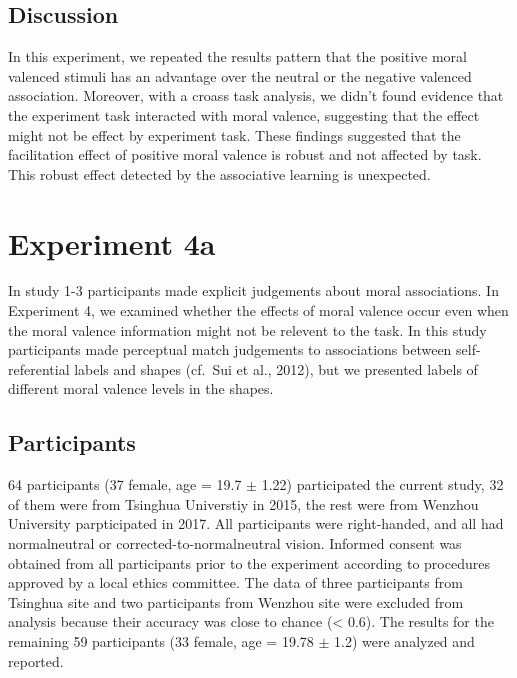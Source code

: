 \documentclass[man]{apa6}
\begin{document}
\hypertarget{discussion-2}{%
\subsection{Discussion}\label{discussion-2}}

In this experiment, we repeated the results pattern that the positive moral valenced stimuli has an advantage over the neutral or the negative valenced association. Moreover, with a croass task analysis, we didn't found evidence that the experiment task interacted with moral valence, suggesting that the effect might not be effect by experiment task.
These findings suggested that the facilitation effect of positive moral valence is robust and not affected by task. This robust effect detected by the associative learning is unexpected.

\hypertarget{experiment-4a}{%
\section{Experiment 4a}\label{experiment-4a}}

In study 1-3 participants made explicit judgements about moral associations. In Experiment 4, we examined whether the effects of moral valence occur even when the moral valence information might not be relevent to the task. In this study participants made perceptual match judgements to associations between self-referential labels and shapes (cf.~Sui et al., 2012), but we presented labels of different moral valence levels in the shapes.

\hypertarget{participants-4}{%
\subsection{Participants}\label{participants-4}}

64 participants (37 female, age = 19.7 \(\pm\) 1.22) participated the current study, 32 of them were from Tsinghua Universtiy in 2015, the rest were from Wenzhou University parpticipated in 2017. All participants were right-handed, and all had normalneutral or corrected-to-normalneutral vision. Informed consent was obtained from all participants prior to the experiment according to procedures approved by a local ethics committee. The data of three participants from Tsinghua site and two participants from Wenzhou site were excluded from analysis because their accuracy was close to chance (\textless{} 0.6). The results for the remaining 59 participants (33 female, age = 19.78 \(\pm\) 1.2) were analyzed and reported.
\end{document}

